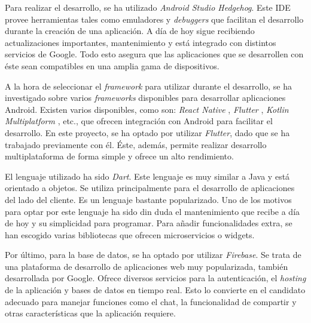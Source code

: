 \documentclass[a4paper, 12pt]{article}
\begin{document}
Para realizar el desarrollo, se ha utilizado \textit{Android Studio Hedgehog}. Este IDE provee herramientas tales como emuladores y \textit{debuggers} que facilitan el desarrollo durante la creación de una aplicación. A día de hoy sigue recibiendo actualizaciones importantes, mantenimiento y está integrado con distintos servicios de Google. Todo esto asegura que las aplicaciones que se desarrollen con éste sean compatibles en una amplia gama de dispositivos. 


A la hora de seleccionar el \textit{framework} para utilizar durante el desarrollo, se ha investigado sobre varios \textit{frameworks} disponibles para desarrollar aplicaciones Android. Existen varios disponibles, como son: \textit{React Native} \cite{reactnative}, \textit{Flutter}  \cite{flutter_dev}, \textit{Kotlin Multiplatform} \cite{kotlin}, etc., que ofrecen integración con Android para facilitar el desarrollo. En este proyecto, se ha optado por utilizar \textit{Flutter}, dado que se ha trabajado previamente con él. Éste, además, permite realizar desarrollo multiplataforma de forma simple y ofrece un alto rendimiento.

El lenguaje utilizado ha sido \textit{Dart}. Este lenguaje es muy similar a Java y está orientado a objetos. Se utiliza principalmente para el desarrollo de aplicaciones del lado del cliente. Es un lenguaje bastante popularizado. Uno de los motivos para optar por este lenguaje ha sido din duda el mantenimiento que recibe a día de hoy y su simplicidad para programar. Para añadir funcionalidades extra, se han escogido varias bibliotecas que ofrecen microservicios o widgets.

Por último, para la base de datos, se ha optado por utilizar \textit{Firebase}. Se trata de una plataforma de desarrollo de aplicaciones web muy popularizada, también desarrollada por Google. Ofrece diversos servicios para la autenticación, el \textit{hosting} de la aplicación y bases de datos en tiempo real. Esto lo convierte en el candidato adecuado para manejar funciones como el chat, la funcionalidad de compartir y otras características que la aplicación requiere.
\end{document}

